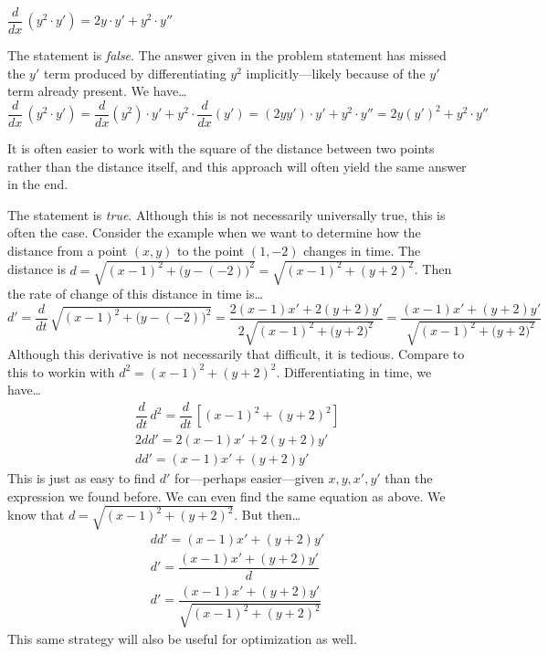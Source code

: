 \documentclass[11pt,letterpaper]{article}
\begin{document}
 $\dfrac{d}{dx}\,(y^2 \cdot y')= 2y \cdot y' + y^2 \cdot y''$ \pspace

\sol The statement is \textit{false}. The answer given in the problem statement has missed the $y'$ term produced by differentiating $y^2$ implicitly---likely because of the $y'$ term already present. We have\dots
	\[
	\dfrac{d}{dx}\,(y^2 \cdot y')= \dfrac{d}{dx}(y^2) \cdot y' + y^2 \cdot \dfrac{d}{dx}(y')= (2yy') \cdot y' + y^2 \cdot y''= 2y (y')^2 + y^2 \cdot y''
	\] \pvspace{1.3cm}



 It is often easier to work with the square of the distance between two points rather than the distance itself, and this approach will often yield the same answer in the end. \pspace

\sol The statement is \textit{true}. Although this is not necessarily universally true, this is often the case. Consider the example when we want to determine how the distance from a point $(x, y)$ to the point $(1, -2)$ changes in time. The distance is $d= \sqrt{(x - 1)^2 + \big(y - (-2) \big)^2}= \sqrt{(x - 1)^2 + (y + 2)^2}$. Then the rate of change of this distance in time is\dots
	\[
	d'= \dfrac{d}{dt}\, \sqrt{(x - 1)^2 + \big(y - (-2) \big)^2}= \dfrac{2(x - 1) x' + 2(y + 2) y'}{2 \sqrt{(x - 1)^2 + \big(y + 2 \big)^2}}= \dfrac{(x - 1) x' + (y + 2) y'}{\sqrt{(x - 1)^2 + \big(y + 2 \big)^2}}
	\]
Although this derivative is not necessarily that difficult, it is tedious. Compare to this to workin with $d^2= (x - 1)^2 + (y + 2)^2$. Differentiating in time, we have\dots
	\[
	\begin{gathered}
	\dfrac{d}{dt}\, d^2= \dfrac{d}{dt}\, \left[ (x - 1)^2 + (y + 2)^2 \right] \\
	2dd'= 2(x - 1) x' + 2(y + 2) y' \\
	dd'= (x - 1) x' + (y + 2) y'
	\end{gathered}
	\]
This is just as easy to find $d'$ for---perhaps easier---given $x, y, x', y'$ than the expression we found before. We can even find the same equation as above. We know that $d= \sqrt{(x - 1)^2 + (y + 2)^2}$. But then\dots
	\[
	\begin{gathered}
	dd'= (x - 1) x' + (y + 2) y' \\
	d'= \dfrac{(x - 1) x' + (y + 2) y'}{d} \\
	d'= \dfrac{(x - 1) x' + (y + 2) y'}{\sqrt{(x - 1)^2 + (y + 2)^2}}
	\end{gathered}
	\]
This same strategy will also be useful for optimization as well. \pvspace{1.3cm}
\end{document}
